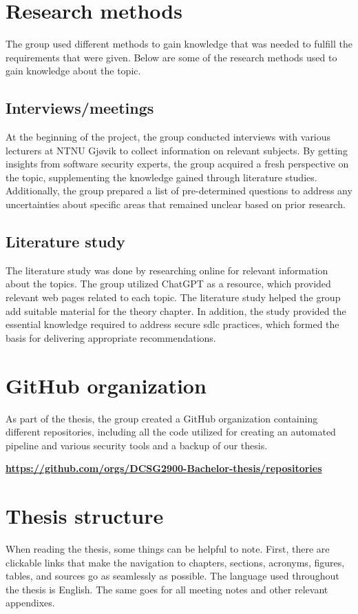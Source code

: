 \section{Research methods}
The group used different methods to gain knowledge that was needed to fulfill the requirements that were given. Below are some of the research methods used to gain knowledge about the topic. 

\subsection{Interviews/meetings}
At the beginning of the project, the group conducted interviews with various lecturers at NTNU Gjøvik to collect information on relevant subjects. By getting insights from software security experts, the group acquired a fresh perspective on the topic, supplementing the knowledge gained through literature studies. Additionally, the group prepared a list of pre-determined questions to address any uncertainties about specific areas that remained unclear based on prior research.  

\subsection{Literature study}
The literature study was done by researching online for relevant information about the topics. The group utilized ChatGPT as a resource, which provided relevant web pages related to each topic. The literature study helped the group add suitable material for the theory chapter. In addition, the study provided the essential knowledge required to address secure \acrshort{sdlc} practices, which formed the basis for delivering appropriate recommendations.

\section{GitHub organization}
As part of the thesis, the group created a GitHub organization containing different repositories, including all the code utilized for creating an automated pipeline and various security tools and a backup of our thesis. 

\href{https://github.com/orgs/DCSG2900-Bachelor-thesis/repositories}{\textbf{https://github.com/orgs/DCSG2900-Bachelor-thesis/repositories}}

\section{Thesis structure}
When reading the thesis, some things can be helpful to note. First, there are clickable links that make the navigation to chapters, sections, acronyms, figures, tables, and sources go as seamlessly as possible. The language used throughout the thesis is English. The same goes for all meeting notes and other relevant appendixes. 


